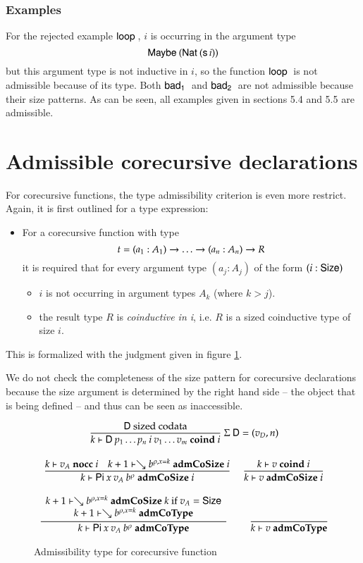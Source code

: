 \subsubsection{Examples}

For the rejected example $\mathsf{loop}\:$, $i$ is occurring in the argument type \[\mathsf{Maybe}\: (\mathsf{Nat}\: (\mathsf{s}\, i))\] but this argument type is not inductive in $i$, so the function $\mathsf{loop}\:$ is not admissible because of its type.
Both $\mathsf{bad_1}\:$ and $\mathsf{bad_2}\:$ are not admissible because their size patterns. 
As can be seen, all examples given in sections 5.4 and 5.5 are admissible.

\section{Admissible corecursive declarations}

For corecursive functions, the type admissibility criterion is even more restrict.
Again, it is first outlined for a type expression:
\begin{itemize}
\item
For a corecursive function with type \[t = (a_1 : A_1) \rightarrow \ldots \rightarrow (a_n : A_n) \rightarrow R\] it is required that 
for every argument type $(a_j : A_j)$ of the form $(i : \mathsf{Size})$  
\begin{itemize}
\item
$i$ is not occurring in argument types $A_k$ (where $k > j$). 
\item
the result type $R$ is \emph{coinductive in i}, i.e. $R$ is a sized coinductive type of size $i$. 
\end{itemize}
\end{itemize}
This is formalized with the judgment given in figure \ref{coadm}.

We do not check the completeness of the size pattern for corecursive declarations because the size argument is determined by the right hand side -- the object that is being defined -- and thus can be seen as inaccessible. 


\begin{figure}[htp]
\begin{gather*}
\ \dfrac{\mathsf{D} \mbox{ sized codata}}{k\vdash\mathsf{D} \: p_1 \ldots p_n \: i \: v_1 \ldots v_m\mbox{ \textbf{coind} }i}
{\: \Sigma \: \mathsf{D} = (v_D,n)}
\\[2ex]
\ \dfrac{k\vdash v_A\mbox{ \textbf{nocc} }i
\quad
k+1\vdash\searrow b^{\rho,x=k}\mbox{ \textbf{admCoSize} }i}{k\vdash\mathsf{Pi} \: x \: v_A \: b^{\rho}\mbox{ \textbf{admCoSize} }i}
\quad
\ \dfrac{k\vdash v\mbox{ \textbf{coind} }i}{k\vdash v\mbox{ \textbf{admCoSize} }i}
\\[2ex]
\ \dfrac{\begin{array}[b]{c}k+1\vdash\searrow b^{\rho,x=k}\mbox{ \textbf{admCoSize} }k \mbox{ if } v_A = \mathsf{Size}\\k+1\vdash\searrow b^{\rho,x=k}\mbox{ \textbf{admCoType}}\end{array}}{k\vdash\mathsf{Pi} \: x \: v_A \: b^{\rho}\mbox{ \textbf{admCoType}}}
\qquad
\ \dfrac{}{k\vdash v\mbox{ \textbf{admCoType}}}
\end{gather*}
\caption{Admissibility type for corecursive function}
\label{coadm}
\end{figure}


